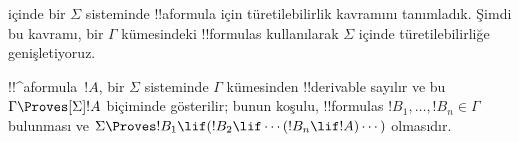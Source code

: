\documentclass[../../../include/open-logic-section]{subfiles}
\begin{document}


 içinde bir $\Sigma$ sisteminde !!a{formula} için
türetilebilirlik kavramını tanımladık. Şimdi bu kavramı, bir $\Gamma$
kümesindeki !!{formula}s kullanılarak $\Sigma$ içinde türetilebilirliğe genişletiyoruz.

\begin{defn}
  !!^a{formula}~$!A$, bir $\Sigma$ sisteminde $\Gamma$ kümesinden
  !!{derivable} sayılır ve bu $\Gamma\Proves[\Sigma]!A$ biçiminde gösterilir;
  bunun koşulu, !!{formula}s $!B_1,\dots,!B_n\in\Gamma$ bulunması ve
  $\Sigma\Proves !B_1\lif(!B_2\lif\cdots(!B_n\lif !A)\cdots)$ olmasıdır.
\end{defn}
\end{document}
